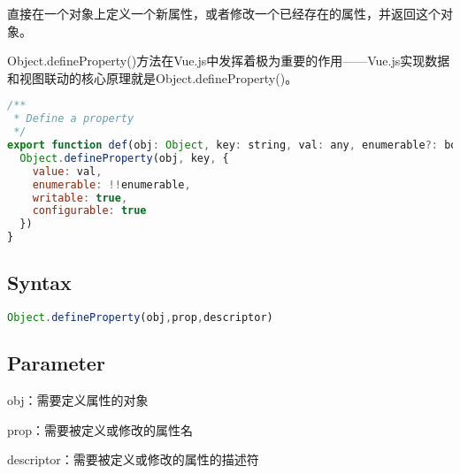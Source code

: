 直接在一个对象上定义一个新属性，或者修改一个已经存在的属性，并返回这个对象。

Object.defineProperty()方法在Vue.js中发挥着极为重要的作用——Vue.js实现数据和视图联动的核心原理就是Object.defineProperty()。



\begin{lstlisting}[language=JavaScript]
/**
 * Define a property
 */
export function def(obj: Object, key: string, val: any, enumerable?: boolean) {
  Object.defineProperty(obj, key, {
    value: val,
    enumerable: !!enumerable,
    writable: true,
    configurable: true
  })
}
\end{lstlisting}


\subsection{Syntax}



\begin{lstlisting}[language=JavaScript]
Object.defineProperty(obj,prop,descriptor)
\end{lstlisting}

\subsection{Parameter}

\begin{compactitem}
\item obj：需要定义属性的对象
\item prop：需要被定义或修改的属性名
\item descriptor：需要被定义或修改的属性的描述符
\end{compactitem}






\begin{lstlisting}[language=JavaScript]

\end{lstlisting}




\begin{lstlisting}[language=JavaScript]

\end{lstlisting}






\begin{lstlisting}[language=JavaScript]

\end{lstlisting}






